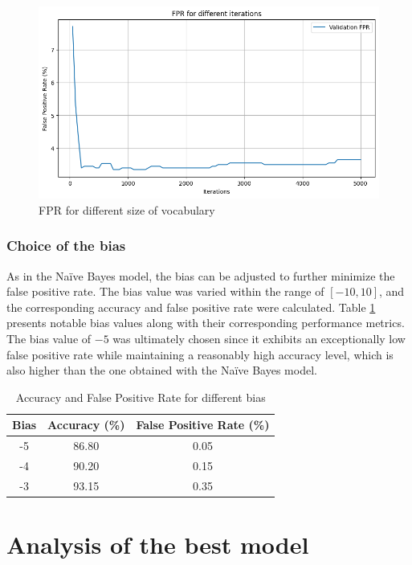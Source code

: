\documentclass{class}
\begin{document}
\begin{figure}[h]
    \centering
    \includegraphics[width=0.7\columnwidth]{images/fpr_logreg_iters.png}
    \caption{FPR for different size of vocabulary}
    \label{fig-10}
\end{figure}
\subsubsection*{Choice of the bias}
As in the Na\"ive Bayes model, the bias can be adjusted to further minimize the false positive rate.
The bias value was varied within the range of $[-10, 10]$, and the corresponding accuracy and false positive rate were calculated.
Table \ref{tab-3} presents notable bias values along with their corresponding performance metrics.
The bias value of $-5$ was ultimately chosen since it exhibits an exceptionally low false positive rate while maintaining a reasonably high accuracy level,
which is also higher than the one obtained with the Na\"ive Bayes model.

\begin{table}[H]
    \centering
    \begin{tabular}{|c|c|c|}
        \hline
        Bias & Accuracy (\%) & False Positive Rate (\%) \\
        \hline
        -5   & 86.80         & 0.05                     \\
        -4   & 90.20         & 0.15                     \\
        -3   & 93.15         & 0.35                     \\
        \hline
    \end{tabular}
    \caption{Accuracy and False Positive Rate for different bias}
    \label{tab-3}
\end{table}
\section{Analysis of the best model}
\end{document}
